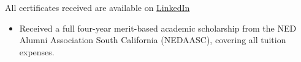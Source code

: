 \documentclass[10pt,a4paper,ragged2e,withhyper]{altacv}
\begin{document}
\begin{paracol}{2}
\divider

All certificates received are available on \href{https://www.linkedin.com/in/mahasnain/details/certifications/}{LinkedIn}


\begin{itemize}
    \item Received a full four-year merit-based academic scholarship from the NED Alumni Association South California (NEDAASC), covering all tuition expenses.

\end{itemize}






\medskip







\end{paracol}
\end{document}
